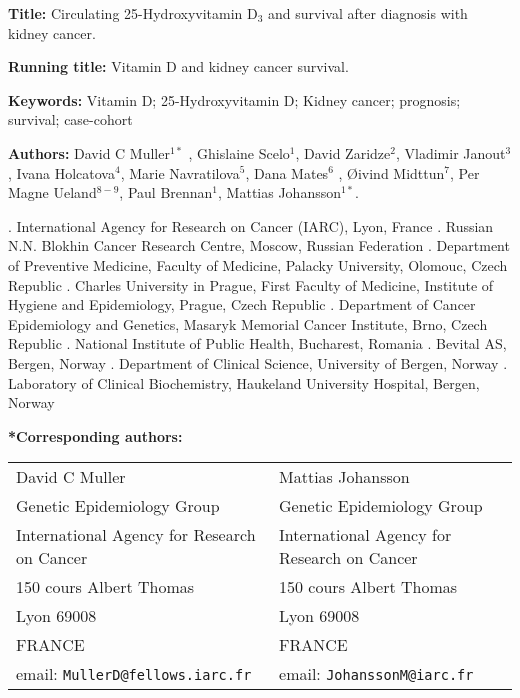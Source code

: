 \documentclass[a4paper,11pt]{article}
\begin{document}
\doublespace
\noindent \textbf{Title:} Circulating 25-Hydroxyvitamin D$_3$ and 
survival after diagnosis with kidney cancer. 

\noindent \textbf{Running title:} Vitamin D and kidney cancer survival.

\noindent \textbf{Keywords:} Vitamin D; 25-Hydroxyvitamin D; Kidney cancer; 
prognosis; survival; case-cohort

\noindent \textbf{Authors:} David C Muller$^{1*}$ , Ghislaine Scelo$^{1}$,  David 
Zaridze$^{2}$, Vladimir Janout$^{3}$, Ivana Holcatova$^{4}$, Marie 
Navratilova$^{5}$, 
Dana Mates$^{6}$ , {\O}ivind Midttun$^{7}$, Per Magne Ueland$^{8-9}$, 
Paul Brennan$^{1}$, 
Mattias Johansson$^{1*}$.

{\footnotesize 
{}. International Agency for Research on Cancer (IARC), Lyon, France . Russian N.N. Blokhin Cancer Research Centre, Moscow, Russian Federation 
. Department of Preventive Medicine, Faculty of Medicine, Palacky University, 
Olomouc, Czech Republic . Charles University in Prague, First Faculty of Medicine, Institute of 
Hygiene 
and Epidemiology, Prague, Czech Republic . Department of Cancer Epidemiology and Genetics, Masaryk Memorial Cancer 
Institute, Brno, Czech Republic . National Institute of Public Health, Bucharest, Romania . Bevital AS, Bergen, Norway . Department of Clinical Science, University of Bergen, Norway . Laboratory of Clinical Biochemistry, Haukeland University Hospital, Bergen, 
Norway
}

\noindent \textbf{*Corresponding authors:} 
\begin{table}[h!]
\begin{tabular}{ll}
David C Muller                  &      Mattias Johansson \\      
Genetic Epidemiology Group      &       Genetic Epidemiology Group  \\
International Agency for Research on Cancer & International Agency for Research on 
Cancer       \\
150 cours Albert Thomas         &  150 cours Albert Thomas      \\
Lyon 69008 &       Lyon 69008\\
FRANCE                     & FRANCE\\
email: \texttt{MullerD@fellows.iarc.fr} & 
email: \texttt{JohanssonM@iarc.fr}
\end{tabular}
\end{table}
\end{document}
